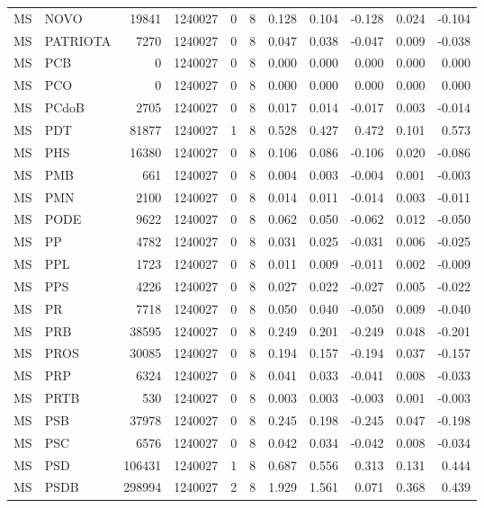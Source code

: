 \begin{landscape}
\begin{longtable}{llrrrrrrrrr}
MS & NOVO & 19841 & 1240027 & 0 & 8 & 0.128 & 0.104 & -0.128 & 0.024 & -0.104 \\
MS & PATRIOTA & 7270 & 1240027 & 0 & 8 & 0.047 & 0.038 & -0.047 & 0.009 & -0.038 \\
MS & PCB & 0 & 1240027 & 0 & 8 & 0.000 & 0.000 & 0.000 & 0.000 & 0.000 \\
MS & PCO & 0 & 1240027 & 0 & 8 & 0.000 & 0.000 & 0.000 & 0.000 & 0.000 \\
MS & PCdoB & 2705 & 1240027 & 0 & 8 & 0.017 & 0.014 & -0.017 & 0.003 & -0.014 \\
MS & PDT & 81877 & 1240027 & 1 & 8 & 0.528 & 0.427 & 0.472 & 0.101 & 0.573 \\
MS & PHS & 16380 & 1240027 & 0 & 8 & 0.106 & 0.086 & -0.106 & 0.020 & -0.086 \\
MS & PMB & 661 & 1240027 & 0 & 8 & 0.004 & 0.003 & -0.004 & 0.001 & -0.003 \\
MS & PMN & 2100 & 1240027 & 0 & 8 & 0.014 & 0.011 & -0.014 & 0.003 & -0.011 \\
MS & PODE & 9622 & 1240027 & 0 & 8 & 0.062 & 0.050 & -0.062 & 0.012 & -0.050 \\
MS & PP & 4782 & 1240027 & 0 & 8 & 0.031 & 0.025 & -0.031 & 0.006 & -0.025 \\
MS & PPL & 1723 & 1240027 & 0 & 8 & 0.011 & 0.009 & -0.011 & 0.002 & -0.009 \\
MS & PPS & 4226 & 1240027 & 0 & 8 & 0.027 & 0.022 & -0.027 & 0.005 & -0.022 \\
MS & PR & 7718 & 1240027 & 0 & 8 & 0.050 & 0.040 & -0.050 & 0.009 & -0.040 \\
MS & PRB & 38595 & 1240027 & 0 & 8 & 0.249 & 0.201 & -0.249 & 0.048 & -0.201 \\
MS & PROS & 30085 & 1240027 & 0 & 8 & 0.194 & 0.157 & -0.194 & 0.037 & -0.157 \\
MS & PRP & 6324 & 1240027 & 0 & 8 & 0.041 & 0.033 & -0.041 & 0.008 & -0.033 \\
MS & PRTB & 530 & 1240027 & 0 & 8 & 0.003 & 0.003 & -0.003 & 0.001 & -0.003 \\
MS & PSB & 37978 & 1240027 & 0 & 8 & 0.245 & 0.198 & -0.245 & 0.047 & -0.198 \\
MS & PSC & 6576 & 1240027 & 0 & 8 & 0.042 & 0.034 & -0.042 & 0.008 & -0.034 \\
MS & PSD & 106431 & 1240027 & 1 & 8 & 0.687 & 0.556 & 0.313 & 0.131 & 0.444 \\
MS & PSDB & 298994 & 1240027 & 2 & 8 & 1.929 & 1.561 & 0.071 & 0.368 & 0.439 \\

\end{longtable}
\end{landscape}
